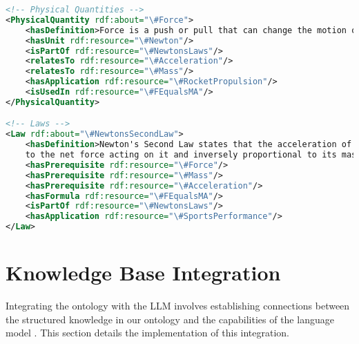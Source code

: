 \begin{lstlisting}[language=XML, caption=Physics Concept Instances, label=lst:ontology-instances]
<!-- Physical Quantities -->
<PhysicalQuantity rdf:about="\#Force">
    <hasDefinition>Force is a push or pull that can change the motion of an object</hasDefinition>
    <hasUnit rdf:resource="\#Newton"/>
    <isPartOf rdf:resource="\#NewtonsLaws"/>
    <relatesTo rdf:resource="\#Acceleration"/>
    <relatesTo rdf:resource="\#Mass"/>
    <hasApplication rdf:resource="\#RocketPropulsion"/>
    <isUsedIn rdf:resource="\#FEqualsMA"/>
</PhysicalQuantity>

<!-- Laws -->
<Law rdf:about="\#NewtonsSecondLaw">
    <hasDefinition>Newton's Second Law states that the acceleration of an object is directly proportional 
    to the net force acting on it and inversely proportional to its mass</hasDefinition>
    <hasPrerequisite rdf:resource="\#Force"/>
    <hasPrerequisite rdf:resource="\#Mass"/>
    <hasPrerequisite rdf:resource="\#Acceleration"/>
    <hasFormula rdf:resource="\#FEqualsMA"/>
    <isPartOf rdf:resource="\#NewtonsLaws"/>
    <hasApplication rdf:resource="\#SportsPerformance"/>
</Law>
\end{lstlisting}

\section{Knowledge Base Integration}
\label{sec:kb-integration}

Integrating the ontology with the LLM involves establishing connections between the structured knowledge in our ontology and the capabilities of the language model \cite{scibite2024ontologies}. This section details the implementation of this integration.

